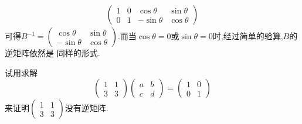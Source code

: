 ﻿\documentclass{book} \usepackage{exsheets} \usepackage{xeCJK}
\begin{document}
\begin{solution}
\begin{align*}
                                                                                                                                                                                                                                                 \begin{pmatrix}
                                                                                                                                                                                                                                                   1&0&\cos\theta&\sin\theta\\
                                                                                                                                                                                                                                                   0&1&-\sin\theta&\cos\theta
                                                                                                                                                                                                                                                 \end{pmatrix}
\end{align*}
可得$B^{-1}=
\begin{pmatrix}
  \cos\theta&\sin\theta\\
  -\sin\theta&\cos\theta
\end{pmatrix}.
$而当$\cos\theta=0$或$\sin\theta=0$时,经过简单的验算,$B$的逆矩阵依然是
同样的形式.
\end{solution}
\begin{question}
  试用求解
$$
\begin{pmatrix}
  1&1\\
  3&3
\end{pmatrix}
\begin{pmatrix}
  a&b\\
  c&d
\end{pmatrix}=
\begin{pmatrix}
  1&0\\
  0&1
\end{pmatrix}
$$
来证明$
\begin{pmatrix}
  1&1\\
  3&3
\end{pmatrix}
$没有逆矩阵.
\end{question}
\end{document}
